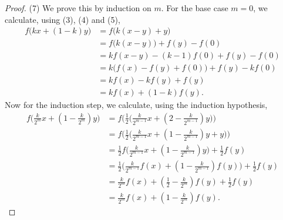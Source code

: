 \begin{proof}
(7) We prove this by induction on $m$. For the base case $m=0$, we calculate, using (3), (4) and (5),
\begin{align*}
f\big(kx + (1-k)y\big) &= f\big(k(x-y) + y\big) \\
&= f\Big(k(x-y)\Big) + f(y) - f(0) \\
&= kf(x-y) - (k-1)f(0) + f(y) - f(0) \\
&= k\Big(f(x)-f(y)+f(0)\Big) +f(y) - kf(0) \\
&= kf(x) - kf(y) + f(y) \\
&= kf(x) + (1-k)f(y).
\end{align*}
Now for the induction step, we calculate, using the induction hypothesis,
\begin{align*}
f\Big(\frac{k}{2^m}x + (1- \frac{k}{2^m})y\Big) &= f\bigg(\frac{1}{2}\Big(\frac{k}{2^{m-1}}x + (2- \frac{k}{2^{m-1}})y\Big)\bigg) \\
&= f\bigg(\frac{1}{2}\Big(\frac{k}{2^{m-1}}x + (1- \frac{k}{2^{m-1}})y + y\Big)\bigg) \\
&= \frac{1}{2}f\Big(\frac{k}{2^{m-1}}x + (1- \frac{k}{2^{m-1}})y\Big) + \frac{1}{2}f(y) \\
&= \frac{1}{2}\Big(\frac{k}{2^{m-1}}f(x) + (1- \frac{k}{2^{m-1}})f(y)\Big) + \frac{1}{2}f(y) \\
&= \frac{k}{2^{m}}f(x) + (\frac{1}{2}- \frac{k}{2^{m}})f(y) + \frac{1}{2}f(y) \\
&= \frac{k}{2^{m}}f(x) + (1- \frac{k}{2^{m}})f(y).
\end{align*}
\end{proof}

